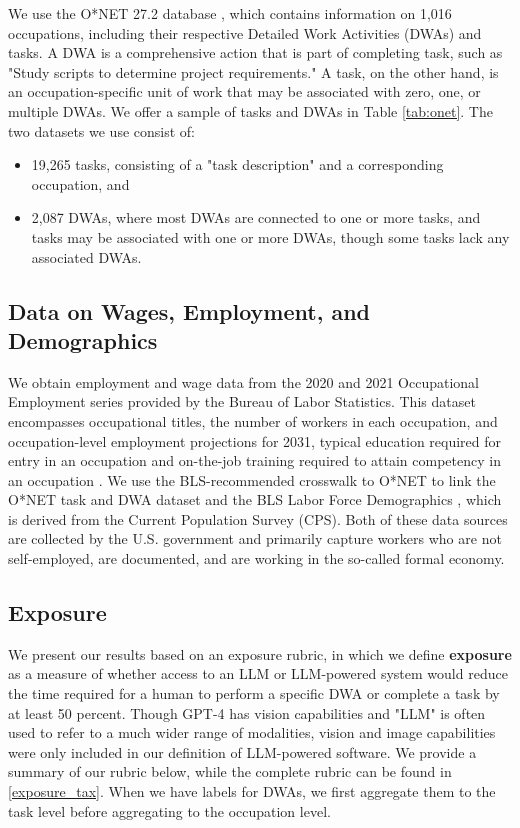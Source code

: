 \documentclass[11pt]{article}
\begin{document}
We use the O*NET 27.2 database \citep{onet272}, which contains information on 1,016 occupations, including their respective Detailed Work Activities (DWAs) and tasks. A DWA is a comprehensive action that is part of completing task, such as "Study scripts to determine project requirements." A task, on the other hand, is an occupation-specific unit of work that may be associated with zero, one, or multiple DWAs. We offer a sample of tasks and DWAs in Table \ref{tab:onet}. The two datasets we use consist of:
\begin{itemize}
    \item 19,265 tasks, consisting of a "task description" and a corresponding occupation, and
    \item 2,087 DWAs, where most DWAs are connected to one or more tasks, and tasks may be associated with one or more DWAs, though some tasks lack any associated DWAs.
\end{itemize}



\subsection{Data on Wages, Employment, and Demographics}

We obtain employment and wage data from the 2020 and 2021 Occupational Employment series provided by the Bureau of Labor Statistics. This dataset encompasses occupational titles, the number of workers in each occupation, and occupation-level employment projections for 2031, typical education required for entry in an occupation and on-the-job training required to attain competency in an occupation \citep{bls_employment_occupation}. We use the BLS-recommended crosswalk to O*NET \citep{bls_crosswalk} to link the O*NET task and DWA dataset and the BLS Labor Force Demographics \citep{bls_demographics}, which is derived from the Current Population Survey (CPS). Both of these data sources are collected by the U.S. government and primarily capture workers who are not self-employed, are documented, and are working in the so-called formal economy.

\subsection{Exposure}


We present our results based on an exposure rubric, in which we define \textbf{exposure} as a measure of whether access to an LLM or LLM-powered system would reduce the time required for a human to perform a specific DWA or complete a task by at least 50 percent. Though GPT-4 has vision capabilities \cite{gpt4} and "LLM" is often used to refer to a much wider range of modalities, vision and image capabilities were only included in our definition of LLM-powered software. We provide a summary of our rubric below, while the complete rubric can be found in \ref{exposure_tax}. When we have labels for DWAs, we first aggregate them to the task level before aggregating to the occupation level.
\end{document}
